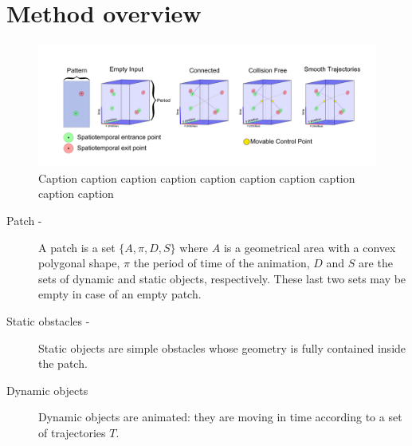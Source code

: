 \section{Method overview}
\label{sec:overview}

\begin{figure}[t]
	\begin{center}
	\includegraphics[width=14cm]{./images/overview-hd.png}
	\caption{ Caption caption caption caption caption caption caption caption caption caption\label{overview}}
	\end{center}
\end{figure}



\begin{description}

\item[Patch - ]{A patch is a set $\{ A, \pi, D, S\}$ where $A$ is a geometrical area with a convex polygonal shape, $\pi$ the period of time of the animation, $D$ and $S$ are the sets of dynamic and static objects, respectively. These last two sets may be empty in case of an empty patch.}

\item[Static obstacles -]{Static objects are simple obstacles whose geometry is fully contained inside the patch.}

\item[Dynamic objects]{Dynamic objects are animated: they are moving in time according to a set of trajectories $T$.}

\end{description}

